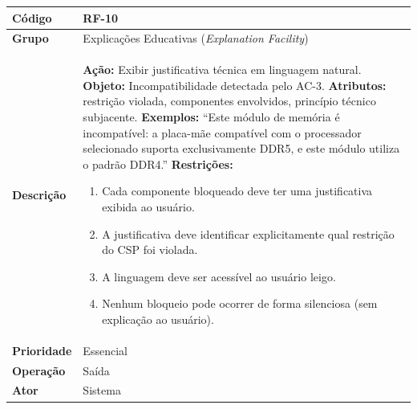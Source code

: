 \FloatBarrier
\begin{quadro}[htb]
  \caption{RF-10 -- Exibir justificativa técnica para cada incompatibilidade}
  \label{quad:rf10}
  \begin{tabular}{|p{3.2cm}|p{11.8cm}|}
    \hline
    \textbf{Código}     & RF-10                                                               \\ \hline
    \textbf{Grupo}      & Explicações Educativas (\textit{Explanation Facility})              \\ \hline
    \textbf{Descrição}  &
    \textbf{Ação:} Exibir justificativa técnica em linguagem natural.
    \textbf{Objeto:} Incompatibilidade detectada pelo AC-3.
    \textbf{Atributos:} restrição violada, componentes envolvidos, princípio técnico subjacente.
    \textbf{Exemplos:} ``Este módulo de memória é incompatível: a placa-mãe compatível com o processador selecionado suporta exclusivamente DDR5, e este módulo utiliza o padrão DDR4.''
    \textbf{Restrições:}
    \begin{enumerate}[nosep,leftmargin=1.2em,topsep=2pt,partopsep=0pt,parsep=0pt,itemsep=1pt]
      \item Cada componente bloqueado deve ter uma justificativa exibida ao usuário.
      \item A justificativa deve identificar explicitamente qual restrição do CSP foi violada.
      \item A linguagem deve ser acessível ao usuário leigo.
      \item Nenhum bloqueio pode ocorrer de forma silenciosa (sem explicação ao usuário).
    \end{enumerate} \\ \hline
    \textbf{Prioridade} & Essencial                                                           \\ \hline
    \textbf{Operação}   & Saída                                                               \\ \hline
    \textbf{Ator}       & Sistema                                                             \\ \hline
  \end{tabular}
\end{quadro}

